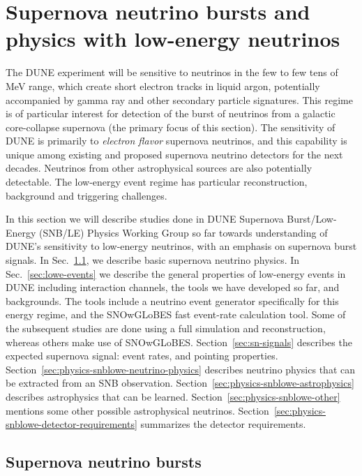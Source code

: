 \chapter{Supernova neutrino bursts and physics with low-energy neutrinos}
\label{ch:snb-lowe}


The DUNE experiment will be sensitive to neutrinos in the few to few
tens of MeV range, which create short electron tracks in liquid argon, potentially accompanied by
gamma ray and other secondary particle signatures.   
This regime is of
particular interest for detection of the burst of neutrinos from a galactic
core-collapse supernova (the primary focus of this section). 
The sensitivity of DUNE is primarily to \textit{electron flavor} supernova neutrinos, and this capability is unique among existing and proposed supernova neutrino detectors for the next decades.  
Neutrinos from other astrophysical sources are also potentially detectable.  
The low-energy event regime has particular reconstruction, background and triggering challenges.

In this section we will describe studies done in DUNE Supernova
Burst/Low-Energy (SNB/LE) Physics Working Group so far towards
understanding of DUNE's sensitivity to low-energy neutrinos, with an
emphasis on supernova burst signals.   In Sec.~\ref{sec:snb-lowe-snb},
we describe basic supernova neutrino physics.  In
Sec.~\ref{sec:lowe-events} we describe the general properties of
low-energy events in DUNE including interaction channels, the tools we
have developed so far, and backgrounds.  The tools include a neutrino event generator
specifically for this energy regime, and the SNOwGLoBES fast event-rate calculation tool.  Some of the subsequent studies are done using
a full simulation and reconstruction, whereas others make use of
SNOwGLoBES.
Section~\ref{sec:sn-signals} describes the
expected supernova signal: event rates, and pointing properties.
Section~\ref{sec:physics-snblowe-neutrino-physics} describes neutrino
physics that can be extracted from an SNB observation.
Section~\ref{sec:physics-snblowe-astrophysics} describes astrophysics
that can be learned.  Section~\ref{sec:physics-snblowe-other} mentions
some other possible astrophysical neutrinos.
Section~\ref{sec:physics-snblowe-detector-requirements} summarizes the
detector requirements.


\section{Supernova neutrino bursts}
\label{sec:snb-lowe-snb}




